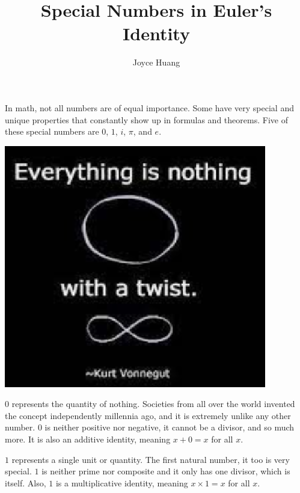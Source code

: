 \documentclass{article}
\title{Special Numbers in Euler’s Identity}
\author{Joyce Huang}
\begin{document}
\maketitle
In math, not all numbers are of equal importance. Some have very special and unique properties that constantly show up in formulas and theorems. Five of these special numbers are $0$, $1$, $i$, $\pi$, and $e$.

\begin{center}
\includegraphics[scale=0.6]{images/specialnum0.png}
\end{center}

$0$ represents the quantity of nothing. Societies from all over the world invented the concept independently millennia ago, and it is extremely unlike any other number. 0 is neither positive nor negative, it cannot be a divisor, and so much more. It is also an additive identity, meaning   $x + 0 = x$ for all $x$. 


$1$ represents a single unit or quantity. The first natural number, it too is very special. $1$ is neither prime nor composite and it only has one divisor, which is itself. Also, $1$ is a multiplicative identity, meaning $x\times 1 = x$ for all $x$. 
\end{document}
